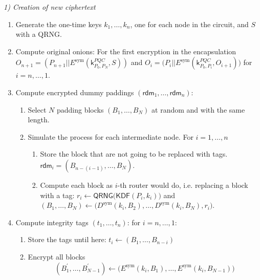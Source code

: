 \documentclass[conference]{IEEEtran}
\begin{document}
\emph{1) Creation of new ciphertext}
\label{subsubsec:creation-on}
\begin{enumerate}[label=\roman*.] 
    \item Generate the one-time keys $k_1, \dots, k_n$, one for each node in the circuit, and $S$ with a QRNG.
    
    \item Compute original onions: For the first encryption in the encapsulation 
    $O_{n+1} = (P_{n+1} || E^{\text{sym}}(\mathsf{k}^{PQC}_{P_0,P_N},S) )$ and $O_i = \bigl(P_i || E^{\text{sym}}(\mathsf{k}^{PQC}_{P_0,P_i},O_{i+1})\bigr)$ for $i = n, \dots, 1$.
      
    \item Compute encrypted dummy paddings $(\mathsf{rdm}_1, \dots, \mathsf{rdm}_n)$:
        \begin{enumerate}
            \item Select $N$ padding blocks $(B_1, \dots, B_N)$ at random and with the same length.
            \item Simulate the process for each intermediate node. For $i =
              1, \dots, n$
                \begin{enumerate}
                    \item Store the block that are not going to be replaced with tags. \(\mathsf{rdm}_i = (B_{n - (i-1)}, \dots, B_N)\).
        
                    \item Compute each block as $i$-th router would do, i.e. replacing a block with a tag: $r_i \leftarrow \mathsf{QRNG}\bigl( \mathsf{KDF}(P_i, k_i)\bigr)$ and
                        $(B_1,\dots,B_N) \leftarrow \bigl( D^{\text{sym}}(k_i, B_2), \dots, D^{\text{sym}}(k_i, B_N), r_i \bigr)$.
                \end{enumerate}
        \end{enumerate}
      
    \item Compute integrity tags $(t_1, \dots, t_n)$: for $i = n, \dots,1$:
        \begin{enumerate}
                \item Store the tags until here: $t_i \leftarrow (B_1,
                \dots, B_{n-i})$
                
                \item Encrypt all blocks 
                \begin{equation*}
                    (B^\prime_1, \dots, B^\prime_{N-1}) \leftarrow \bigl(
                  E^{\text{sym}}(k_i, B_1), \dots, E^{\text{sym}}(k_i, B_{N-1}) \bigr)
                  \end{equation*}
                

\end{enumerate}
\end{enumerate}
\end{document}
